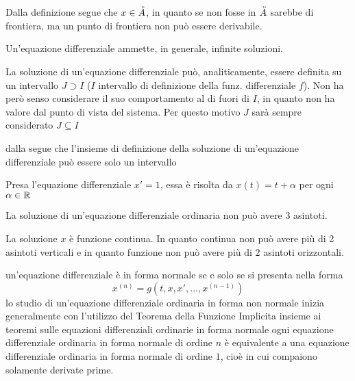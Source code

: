 \begin{note} \hypertarget{def:equaz_diff_sol}{}
	Dalla definizione segue che $x \in \accentset{\circ}{A}$, in quanto se non fosse in $\accentset{\circ}{A}$ sarebbe di frontiera, ma un punto di frontiera non può essere derivabile.
\end{note}
\begin{note}
	Un'equazione differenziale ammette, in generale, infinite soluzioni.
\end{note}
\begin{note} \hypertarget{note:diff_eq_sol_definit_set}{}
	La soluzione di un'equazione differenziale può, analiticamente, essere definita su un intervallo $J\supset I$ ($I$ intervallo di definizione della funz. differenziale $f$). Non ha però senso considerare il suo comportamento al di fuori di $I$, in quanto non ha valore dal punto di vista del sistema. Per questo motivo $J$ sarà sempre considerato $J\subseteq I$
\end{note}
\begin{note}
	dalla  segue che l'insieme di definizione della soluzione di un'equazione differenziale può essere solo un intervallo
\end{note}
\begin{example}
	Presa l'equazione differenziale $ x'=1$, essa è risolta da $x(t) = t + \alpha$ per ogni $\alpha\in\mathbb{R}$
\end{example}
\begin{exercise}
	La soluzione di un'equazione differenziale ordinaria non può avere 3 asintoti.
	\begin{solution}
		La soluzione $x$ è funzione continua. In quanto continua non può avere più di 2 asintoti verticali e in quanto funzione non può avere più di 2 asintoti orizzontali.
	\end{solution}
\end{exercise}
un'equazione differenziale è in forma normale  se e solo se si presenta nella forma 
$$x^{(n)} = g(t,x, x',\ldots,x^{(n-1)})$$
\observation
lo studio di un'equazione differenziale ordinaria in forma non normale inizia generalmente con l'utilizzo del Teorema della Funzione Implicita insieme ai teoremi sulle equazioni differenziali ordinarie in forma normale
\proposition\label{prop:equaz_n_equival_1}
ogni equazione differenziale ordinaria in forma normale di ordine $n$ è equivalente a una equazione differenziale ordinaria in forma normale di ordine $1$, cioè in cui compaiono solamente derivate prime.
